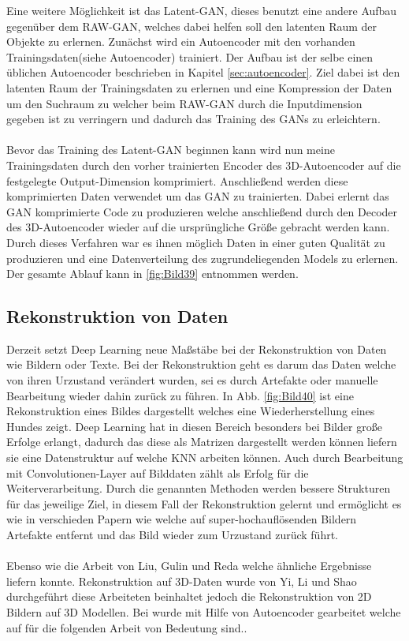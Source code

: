 \documentclass{llncs}
\begin{document}
Eine weitere Möglichkeit ist das Latent-GAN, dieses benutzt eine andere Aufbau gegenüber dem RAW-GAN, welches dabei helfen soll den latenten Raum der Objekte zu erlernen. Zunächst wird ein Autoencoder mit den vorhanden Trainingsdaten(siehe Autoencoder) trainiert. Der Aufbau ist der selbe einen üblichen Autoencoder beschrieben in Kapitel \ref{sec:autoencoder}. Ziel dabei ist den latenten Raum der Trainingsdaten zu erlernen und eine Kompression der Daten um den Suchraum zu  welcher beim RAW-GAN durch die Inputdimension gegeben ist zu verringern und dadurch das Training des GANs zu erleichtern\cite{3dgan}. 
\\\\
Bevor das Training des Latent-GAN beginnen kann wird nun meine Trainingsdaten durch den vorher trainierten Encoder des 3D-Autoencoder auf die festgelegte Output-Dimension komprimiert. Anschließend werden diese komprimierten Daten verwendet um das GAN zu trainierten. Dabei erlernt das GAN komprimierte Code zu produzieren welche anschließend durch den Decoder des 3D-Autoencoder wieder auf die ursprüngliche Größe gebracht werden kann. Durch dieses Verfahren war es ihnen möglich Daten in einer guten Qualität zu produzieren und eine Datenverteilung des zugrundeliegenden Models zu erlernen. Der gesamte Ablauf kann in \ref{fig:Bild39} entnommen werden\cite{3dgan}. 



\subsection{Rekonstruktion von Daten}\label{sec:rekdaten}

Derzeit setzt Deep Learning neue Maßstäbe bei der Rekonstruktion von Daten wie Bildern oder Texte. Bei der Rekonstruktion geht es darum das Daten welche von ihren Urzustand verändert wurden, sei es durch Artefakte oder manuelle Bearbeitung wieder dahin zurück zu führen. In Abb. \ref{fig:Bild40} ist eine Rekonstruktion eines Bildes dargestellt welches eine Wiederherstellung eines Hundes zeigt. Deep Learning hat in diesen Bereich besonders bei Bilder große Erfolge erlangt, dadurch das diese als Matrizen dargestellt werden können liefern sie eine Datenstruktur auf welche KNN arbeiten können. Auch durch Bearbeitung mit Convolutionen-Layer auf Bilddaten zählt als Erfolg für die Weiterverarbeitung\cite{imagerecon}. Durch die genannten Methoden werden bessere Strukturen für das jeweilige Ziel, in diesem Fall der Rekonstruktion gelernt und ermöglicht es wie in verschieden Papern wie \cite{imagere1}  welche auf super-hochauflösenden Bildern Artefakte entfernt und das Bild wieder zum Urzustand zurück führt.
\\\\
Ebenso wie die Arbeit von Liu, Gulin und Reda \cite{imagere2} welche ähnliche Ergebnisse liefern konnte. Rekonstruktion auf 3D-Daten wurde von Yi, Li und Shao \cite{3d_recon} durchgeführt diese Arbeiteten beinhaltet jedoch die Rekonstruktion von 2D Bildern auf 3D Modellen. Bei wurde mit Hilfe von Autoencoder gearbeitet welche auf für die folgenden Arbeit von Bedeutung sind.\cite{3d_recon}. 
\end{document}
